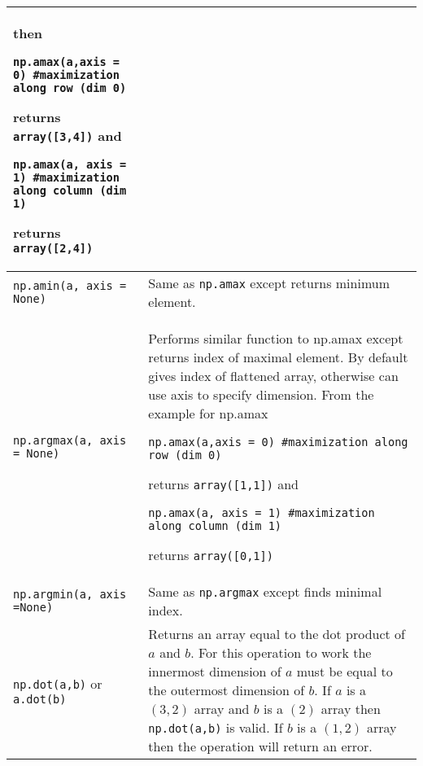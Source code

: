 \documentclass[]{article}
\begin{document}
\begin{longtable}{ | m{6cm}  | m{11cm} |}
    then
	\begin{verbatim}
np.amax(a,axis = 0) #maximization along row (dim 0)
	\end{verbatim}
    returns {\texttt{array([3,4])} } and 
	\begin{verbatim}
np.amax(a, axis = 1) #maximization along column (dim 1)
	\end{verbatim}
    returns {\texttt{array([2,4])} }
	\\\hline
	\texttt{np.amin(a, axis = None)} & Same as {\texttt{np.amax} } except returns minimum element.
	\\\hline
	\texttt{np.argmax(a, axis = None)} & Performs similar function to np.amax except returns index of maximal element.  By default gives index of flattened array, otherwise can use axis to specify dimension.  From the example for np.amax
	\begin{verbatim}
np.amax(a,axis = 0) #maximization along row (dim 0)
	\end{verbatim}
    returns {\texttt{array([1,1])} } and 
	\begin{verbatim}
np.amax(a, axis = 1) #maximization along column (dim 1)
	\end{verbatim}
    returns {\texttt{array([0,1])} }
	\\\hline
	\texttt{np.argmin(a, axis =None)} & Same as {\texttt{np.argmax} } except finds minimal index.
	\\\hline
\texttt{np.dot(a,b)} or \texttt{a.dot(b)} & Returns an array equal to the dot product of $a$ and $b$.  For this operation to work the innermost dimension of $a$ must be equal to the outermost dimension of $b$.  If $a$ is a $(3,2)$ array and $b$ is a $(2)$ array then \texttt{np.dot(a,b)} is valid.  If $b$ is a $(1,2)$ array then the operation will return an error.
	\\\hline
\end{longtable}

\end{document}
